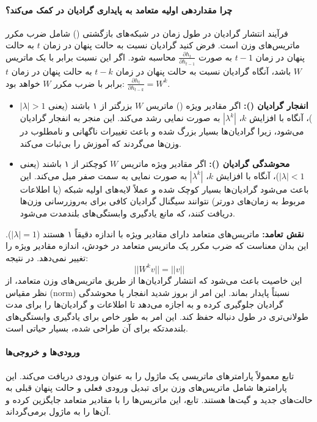 \documentclass{article}
\begin{document}
\paragraph{چرا مقداردهی اولیه متعامد به پایداری گرادیان در  کمک می‌کند؟}
فرآیند انتشار گرادیان در طول زمان در شبکه‌های بازگشتی () شامل ضرب مکرر ماتریس‌های وزن است. فرض کنید گرادیان نسبت به حالت پنهان در زمان \(t\) به حالت پنهان در زمان \(t-1\) به صورت \(\frac{\partial h_t}{\partial h_{t-1}}\) محاسبه شود. اگر این نسبت برابر با یک ماتریس \(W\) باشد، آنگاه گرادیان نسبت به حالت پنهان در زمان \(t-k\) به حالت پنهان در زمان \(t\) برابر با ضرب مکرر \(W\) خواهد بود: \(\frac{\partial h_t}{\partial h_{t-k}} = W^k\).

\begin{itemize}
	\item \textbf{انفجار گرادیان ():} اگر مقادیر ویژه () ماتریس \(W\) بزرگتر از ۱ باشند (یعنی \(|\lambda| > 1\))، آنگاه با افزایش \(k\)، \(|\lambda^k|\) به صورت نمایی رشد می‌کند. این منجر به انفجار گرادیان می‌شود، زیرا گرادیان‌ها بسیار بزرگ شده و باعث تغییرات ناگهانی و نامطلوب در وزن‌ها می‌گردند که آموزش را بی‌ثبات می‌کند.
	\item \textbf{محوشدگی گرادیان ():} اگر مقادیر ویژه ماتریس \(W\) کوچکتر از ۱ باشند (یعنی \(|\lambda| < 1\))، آنگاه با افزایش \(k\)، \(|\lambda^k|\) به صورت نمایی به سمت صفر میل می‌کند. این باعث می‌شود گرادیان‌ها بسیار کوچک شده و عملاً لایه‌های اولیه شبکه (یا اطلاعات مربوط به زمان‌های دورتر) نتوانند سیگنال گرادیان کافی برای به‌روزرسانی وزن‌ها دریافت کنند، که مانع یادگیری وابستگی‌های بلندمدت می‌شود.
\end{itemize}

\textbf{نقش تعامد:}
ماتریس‌های متعامد دارای مقادیر ویژه با اندازه دقیقاً ۱ هستند (\(|\lambda| = 1\)). این بدان معناست که ضرب مکرر یک ماتریس متعامد در خودش، اندازه مقادیر ویژه را تغییر نمی‌دهد. در نتیجه:
\begin{equation}
	||W^k v|| = ||v||
\end{equation}
این خاصیت باعث می‌شود که انتشار گرادیان‌ها از طریق ماتریس‌های وزن متعامد، از نظر مقیاس (norm) نسبتاً پایدار بماند. این امر از بروز شدید انفجار یا محوشدگی گرادیان جلوگیری کرده و به  اجازه می‌دهد تا اطلاعات و گرادیان‌ها را برای مدت طولانی‌تری در طول دنباله حفظ کند. این امر به طور خاص برای یادگیری وابستگی‌های بلندمدتکه  برای آن طراحی شده، بسیار حیاتی است.

\paragraph{ورودی‌ها و خروجی‌ها}
تابع  معمولاً پارامترهای ماتریسی یک ماژول  را به عنوان ورودی دریافت می‌کند. این پارامترها شامل ماتریس‌های وزن برای تبدیل ورودی فعلی و حالت پنهان قبلی به حالت‌های جدید و گیت‌ها هستند. تابع، این ماتریس‌ها را با مقادیر متعامد جایگزین کرده و آن‌ها را به ماژول  برمی‌گرداند.
\end{document}
